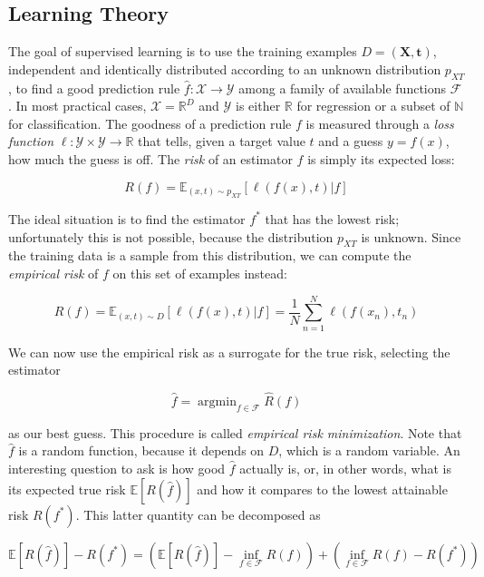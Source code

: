 \documentclass[12pt]{book}
\DeclareMathOperator*{\argmin}{argmin}
\begin{document}
\subsection{Learning Theory}
The goal of supervised learning is to use the training examples $D=(\bm X, \bm t)$, independent and identically distributed according to an unknown distribution $p_{XT}$, to find a good prediction rule $\hat{f}:\mathcal{X}\rightarrow\mathcal{Y}$ among a family of available functions $\mathcal{F}$. In most practical cases, $\mathcal{X}=\mathbb{R}^D$ and $\mathcal{Y}$ is either $\mathbb{R}$ for regression or a subset of $\mathbb{N}$ for classification. The goodness of a prediction rule $f$ is measured through a \emph{loss function} $\ell:\mathcal{Y}\times\mathcal{Y}\rightarrow\mathbb{R}$ that tells, given a target value $t$ and a guess $y=f(x)$, how much the guess is off. The \emph{risk} of an estimator $f$ is simply its expected loss:

\begin{equation}
R(f)=\mathbb{E}_{(x,t)\sim p_{XT}}\left[\ell(f(x),t) \vert f \right]
\end{equation}

The ideal situation is to find the estimator $f^*$ that has the lowest risk; unfortunately this is not possible, because the distribution $p_{XT}$ is unknown. Since the training data is a sample from this distribution, we can compute the \emph{empirical risk} of $f$ on this set of examples instead:

\begin{equation}
\hat{R}(f)=\mathbb{E}_{(x,t)\sim D}\left[\ell(f(x),t)\vert f\right]=\frac{1}{N}\sum_{n=1}^N \ell(f(x_n),t_n)
\end{equation}

We can now use the empirical risk as a surrogate for the true risk, selecting the estimator

\begin{equation}
\hat{f}=\argmin_{f\in\mathcal{F}}\hat{R}(f)
\end{equation}

as our best guess. This procedure is called \emph{empirical risk minimization}. Note that $\hat{f}$ is a random function, because it depends on $D$, which is a random variable. An interesting question to ask is how good $\hat{f}$ actually is, or, in other words, what is its expected true risk $\mathbb{E}[R(\hat{f})]$ and how it compares to the lowest attainable risk $R(f^*)$. This latter quantity can be decomposed as

\begin{equation}
\mathbb{E}[R(\hat{f})]-R(f^*)=
\left(\mathbb{E}[R(\hat{f})]-\inf_{f\in\mathcal{F}} R(f)\right)
+\left(\inf_{f\in\mathcal{F}} R(f)-R(f^*)\right)
\end{equation}
\end{document}
